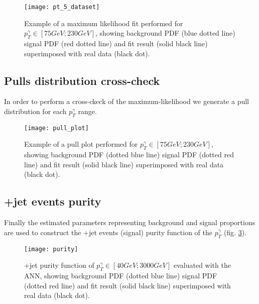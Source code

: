\begin{figure}[h!]
\centering
    \texttt{[image: pt\_5\_dataset]}
    \caption{Example of a maximum likelihood fit performed for $p_T^\gamma \in [ 75 GeV ; 230 GeV ]$, showing background
    PDF (blue dotted line) signal PDF (red dotted line) and fit result (solid black line) superimposed with real data (black dot).}
    \label{pt_5_dataset}
\end{figure}

\subsection{Pulls distribution cross-check}

In order to perform a cross-ckeck of the maximum-likelihood we generate a pull distribution for each $p_T^\gamma$ range.

\begin{figure}[h!]
\centering
    \texttt{[image: pull\_plot]}
    \caption{Example of a pull plot performed for $p_T^\gamma \in [ 75 GeV ; 230 GeV ]$, showing background PDF (dotted
    blue line) signal PDF (dotted red line) and fit result (solid black line) superimposed with real data (black dot).}
    \label{pull_plot}
\end{figure}

\subsection{\textgamma+jet events purity}

Finally the estimated parameters representing background and signal proportions are used to construct the \textgamma+jet
events (signal) purity function of the $p_T^\gamma$ (fig. \ref{purity}).
\begin{figure}[h!]
\centering
    \texttt{[image: purity]}
    \caption{\textgamma+jet purity function of $p_T^\gamma \in [ 40 GeV ; 3000 GeV ]$ evaluated with the ANN, showing background PDF (dotted
    blue line) signal PDF (dotted red line) and fit result (solid black line) superimposed with real data (black dot).}
    \label{purity}
\end{figure}

